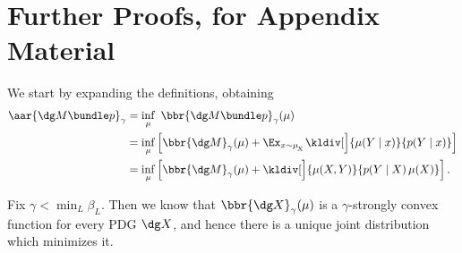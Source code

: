  \section{Further Proofs, for Appendix Material}

\begin{lproof}\label{proof:smooth-and-strictly-cvx}
	We start by expanding the definitions, obtaining
	\begin{align*}
		\aar{\dg M \bundle p}_\gamma &= \inf_\mu ~\bbr{\dg M \bundle p}_\gamma(\mu) \\
			&= \inf_\mu \left[ \bbr{\dg M }_\gamma(\mu)
				+ \Ex_{x\sim\mu_{\!_X}} \kldiv[\Big]{\mu(Y\mid x)}{p(Y\mid x)} \right]\\
			&= \inf_\mu \left[ \bbr{\dg M }_\gamma(\mu)
				+  \kldiv[\Big]{\mu(X,Y)}{p(Y \mid X)\, \mu(X)} \right].
	\end{align*}


	Fix $\gamma < \min_L \beta_L$. Then we know that $\bbr{\dg X}_\gamma(\mu)$ is a $\gamma$-strongly convex function for every PDG $\dg X$, and hence there is a unique joint distribution which minimizes it.


\end{lproof}
